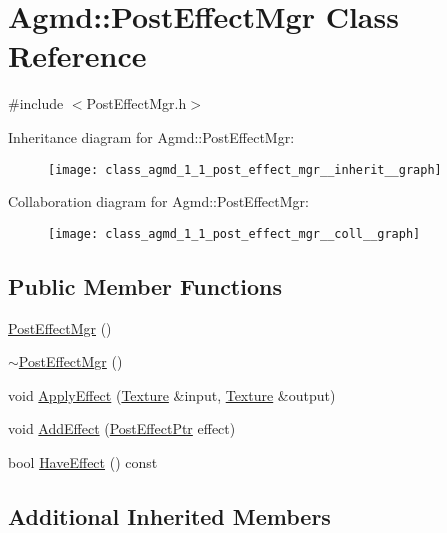 \hypertarget{class_agmd_1_1_post_effect_mgr}{\section{Agmd\+:\+:Post\+Effect\+Mgr Class Reference}
\label{class_agmd_1_1_post_effect_mgr}
}


{\ttfamily \#include $<$Post\+Effect\+Mgr.\+h$>$}



Inheritance diagram for Agmd\+:\+:Post\+Effect\+Mgr\+:\nopagebreak
\begin{figure}[H]
\begin{center}
\leavevmode
\texttt{[image: class\_agmd\_1\_1\_post\_effect\_mgr\_\_inherit\_\_graph]}
\end{center}
\end{figure}


Collaboration diagram for Agmd\+:\+:Post\+Effect\+Mgr\+:\nopagebreak
\begin{figure}[H]
\begin{center}
\leavevmode
\texttt{[image: class\_agmd\_1\_1\_post\_effect\_mgr\_\_coll\_\_graph]}
\end{center}
\end{figure}
\subsection*{Public Member Functions}
\begin{DoxyCompactItemize}
\item 
\hyperlink{class_agmd_1_1_post_effect_mgr_a791e1218f43f828f04680e8dab65ed73}{Post\+Effect\+Mgr} ()
\item 
\hyperlink{class_agmd_1_1_post_effect_mgr_a26ceb2cefdac32755d98f670284203f5}{$\sim$\+Post\+Effect\+Mgr} ()
\item 
void \hyperlink{class_agmd_1_1_post_effect_mgr_a25808f36e56fcf0381bc8699075e66b4}{Apply\+Effect} (\hyperlink{class_agmd_1_1_texture}{Texture} \&input, \hyperlink{class_agmd_1_1_texture}{Texture} \&output)
\item 
void \hyperlink{class_agmd_1_1_post_effect_mgr_acd586835c47a663106233cd8857ad6a8}{Add\+Effect} (\hyperlink{namespace_agmd_aded2fb07d1a048d839c8ffeeb56de7cb}{Post\+Effect\+Ptr} effect)
\item 
bool \hyperlink{class_agmd_1_1_post_effect_mgr_a962ccc33dd1315250b9ac8c1abcadfb2}{Have\+Effect} () const 
\end{DoxyCompactItemize}
\subsection*{Additional Inherited Members}


